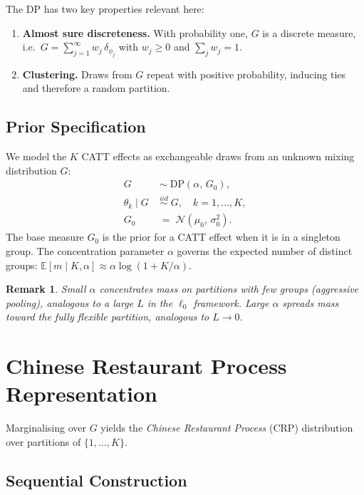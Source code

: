 \documentclass[12pt]{article}
\newtheorem{remark}{Remark}
\newcommand{\DP}{\mathrm{DP}}
\newcommand{\Normal}{\mathcal{N}}
\newcommand{\E}{\mathbb{E}}
\newcommand{\1}{\mathbbm{1}}
\begin{document}
The DP has two key properties relevant here:
\begin{enumerate}
  \item \textbf{Almost sure discreteness.} With probability one, $G$ is a
    discrete measure, i.e.\ $G = \sum_{j=1}^\infty w_j\,\delta_{\phi_j}$ with
    $w_j\geq 0$ and $\sum_j w_j = 1$.
  \item \textbf{Clustering.} Draws from $G$ repeat with positive probability,
    inducing ties and therefore a random partition.
\end{enumerate}

\subsection{Prior Specification}

We model the $K$ CATT effects as exchangeable draws from an unknown mixing
distribution $G$:
\begin{align}
  G \;&\sim\; \DP(\alpha,\, G_0), \\
  \theta_k \mid G \;&\overset{iid}{\sim}\; G, \quad k=1,\ldots,K, \\
  G_0 \;&=\; \Normal(\mu_0,\, \sigma_0^2).
\end{align}
The base measure $G_0$ is the prior for a CATT effect when it is in a singleton
group. The concentration parameter $\alpha$ governs the expected number of
distinct groups: $\E[m\mid K,\alpha] \approx \alpha\log(1 + K/\alpha)$.

\begin{remark}
  Small $\alpha$ concentrates mass on partitions with few groups (aggressive
  pooling), analogous to a large $L$ in the $\ell_0$ framework. Large $\alpha$
  spreads mass toward the fully flexible partition, analogous to $L\to 0$.
\end{remark}

\section{Chinese Restaurant Process Representation}

Marginalising over $G$ yields the \emph{Chinese Restaurant Process} (CRP)
distribution over partitions of $\{1,\ldots,K\}$.

\subsection{Sequential Construction}
\end{document}
